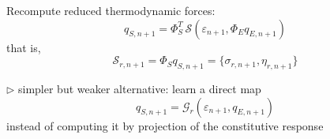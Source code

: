 \documentclass[11pt,a4paper]{article}
\begin{document}
\begin{algorithmic}[1]
        \State Recompute reduced thermodynamic forces:
        \[
        q_{S,n+1}
        =
        \Phi_S^T\,\mathcal S(\varepsilon_{n+1},\Phi_E q_{E,n+1})
        \]
        that is,
        \[
        \mathcal S_{r,n+1}
        =
        \Phi_S q_{S,n+1}
        =
        \{\sigma_{r,n+1},\eta_{r,n+1}\}
        \]

        \Statex \hspace{\algorithmicindent}
        $\triangleright$ simpler but weaker alternative: learn a direct map
        \[
        q_{S,n+1}=\mathcal G_r(\varepsilon_{n+1},q_{E,n+1})
        \]
        instead of computing it by projection of the constitutive response
    \EndIf

\EndFor

\end{algorithmic}
\end{document}

